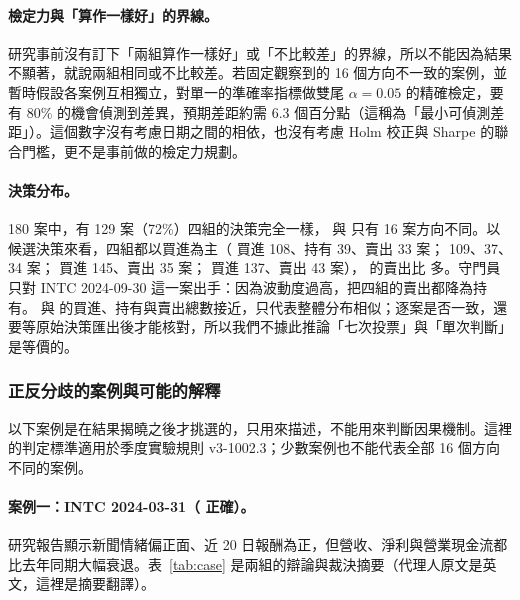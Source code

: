 \paragraph{檢定力與「算作一樣好」的界線。} 研究事前沒有訂下「兩組算作一樣好」或「不比較差」的界線，所以不能因為結果不顯著，就說兩組相同或不比較差。若固定觀察到的 16 個方向不一致的案例，並暫時假設各案例互相獨立，對單一的準確率指標做雙尾 $\alpha=0.05$ 的精確檢定，要有 80\% 的機會偵測到差異，預期差距約需 6.3 個百分點（這稱為「最小可偵測差距」）。這個數字沒有考慮日期之間的相依，也沒有考慮 Holm 校正與 Sharpe 的聯合門檻，更不是事前做的檢定力規劃。

\paragraph{決策分布。} 180 案中，有 129 案（72\%）四組的決策完全一樣， 與  只有 16 案方向不同。以候選決策來看，四組都以買進為主（ 買進 108、持有 39、賣出 33 案； 109、37、34 案； 買進 145、賣出 35 案； 買進 137、賣出 43 案）， 的賣出比  多。守門員只對 INTC 2024-09-30 這一案出手：因為波動度過高，把四組的賣出都降為持有。 與  的買進、持有與賣出總數接近，只代表整體分布相似；逐案是否一致，還要等原始決策匯出後才能核對，所以我們不據此推論「七次投票」與「單次判斷」是等價的。
\subsubsection{正反分歧的案例與可能的解釋}

以下案例是在結果揭曉之後才挑選的，只用來描述，不能用來判斷因果機制。這裡的判定標準適用於季度實驗規則 v3-1002.3；少數案例也不能代表全部 16 個方向不同的案例。
\paragraph{案例一：INTC 2024-03-31（ 正確）。} 研究報告顯示新聞情緒偏正面、近 20 日報酬為正，但營收、淨利與營業現金流都比去年同期大幅衰退。表~\ref{tab:case} 是兩組的辯論與裁決摘要（代理人原文是英文，這裡是摘要翻譯）。

